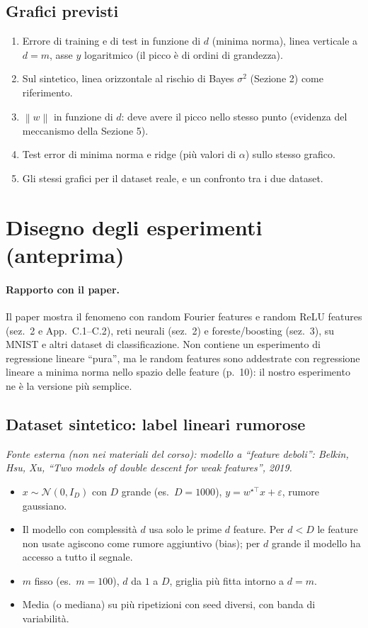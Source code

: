 \documentclass[11pt,a4paper]{article}
\newcommand{\norm}[1]{\left\lVert #1 \right\rVert}
\newcommand{\esterna}[1]{\par\noindent\textit{Fonte esterna (non nei materiali del corso): #1}\par\smallskip}
\begin{document}
\subsection{Grafici previsti}
\begin{enumerate}
  \item Errore di training e di test in funzione di $d$ (minima norma), linea verticale a $d = m$, asse $y$ logaritmico
        (il picco è di ordini di grandezza).
  \item Sul sintetico, linea orizzontale al rischio di Bayes $\sigma^2$ (Sezione 2) come riferimento.
  \item $\norm{w}$ in funzione di $d$: deve avere il picco nello stesso punto (evidenza del meccanismo della Sezione 5).
  \item Test error di minima norma e ridge (più valori di $\alpha$) sullo stesso grafico.
  \item Gli stessi grafici per il dataset reale, e un confronto tra i due dataset.
\end{enumerate}

\section{Disegno degli esperimenti (anteprima)}

\paragraph{Rapporto con il paper.} Il paper mostra il fenomeno con random Fourier features e random ReLU features (sez.~2 e App.~C.1--C.2), reti neurali (sez.~2) e foreste/boosting (sez.~3), su MNIST e altri dataset di classificazione. Non contiene un esperimento di regressione lineare ``pura'', ma le random features sono addestrate con regressione lineare a minima norma nello spazio delle feature (p.~10): il nostro esperimento ne è la versione più semplice.

\subsection{Dataset sintetico: label lineari rumorose}
\esterna{modello a ``feature deboli'': Belkin, Hsu, Xu, ``Two models of double descent for weak features'', 2019.}
\begin{itemize}
  \item $x \sim \mathcal{N}(0, I_D)$ con $D$ grande (es.\ $D = 1000$), $y = w^{\star\top}x + \varepsilon$, rumore gaussiano.
  \item Il modello con complessità $d$ usa solo le prime $d$ feature. Per $d < D$ le feature non usate agiscono come
        rumore aggiuntivo (bias); per $d$ grande il modello ha accesso a tutto il segnale.
  \item $m$ fisso (es.\ $m = 100$), $d$ da $1$ a $D$, griglia più fitta intorno a $d = m$.
  \item Media (o mediana) su più ripetizioni con seed diversi, con banda di variabilità.
\end{itemize}
\end{document}
